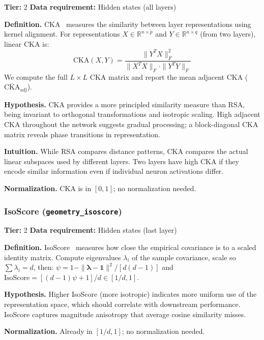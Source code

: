 \documentclass{article}
\begin{document}
\textbf{Tier:} 2 \quad \textbf{Data requirement:} Hidden states (all layers)

\textbf{Definition.}
CKA~\citep{kornblith2019similarity} measures the similarity between layer representations using kernel alignment. For representations $X \in \mathbb{R}^{n \times p}$ and $Y \in \mathbb{R}^{n \times q}$ (from two layers), linear CKA is:
\begin{equation}
  \text{CKA}(X, Y) = \frac{\|Y^T X\|_F^2}{\|X^T X\|_F \cdot \|Y^T Y\|_F}
\end{equation}
We compute the full $L \times L$ CKA matrix and report the mean adjacent CKA ($\overline{\text{CKA}}_{\text{adj}}$).

\textbf{Hypothesis.}
CKA provides a more principled similarity measure than RSA, being invariant to orthogonal transformations and isotropic scaling. High adjacent CKA throughout the network suggests gradual processing; a block-diagonal CKA matrix reveals phase transitions in representation.

\textbf{Intuition.}
While RSA compares distance patterns, CKA compares the actual linear subspaces used by different layers. Two layers have high CKA if they encode similar information even if individual neuron activations differ.

\textbf{Normalization.} CKA is in $[0, 1]$; no normalization needed.

\subsubsection{IsoScore (\texttt{geometry\_isoscore})}
\label{app:isoscore}

\textbf{Tier:} 2 \quad \textbf{Data requirement:} Hidden states (last layer)

\textbf{Definition.}
IsoScore~\citep{rudman2022isoscore} measures how close the empirical covariance is to a scaled identity matrix. Compute eigenvalues $\lambda_i$ of the sample covariance, scale so $\sum \lambda_i = d$, then:
$\psi = 1 - \|\boldsymbol{\lambda} - \mathbf{1}\|^2 / [d(d-1)]$ and $\text{IsoScore} = [(d-1)\psi + 1] / d \in [1/d, 1]$.

\textbf{Hypothesis.} Higher IsoScore (more isotropic) indicates more uniform use of the representation space, which should correlate with downstream performance. IsoScore captures magnitude anisotropy that average cosine similarity misses.

\textbf{Normalization.} Already in $[1/d, 1]$; no normalization needed.
\end{document}
